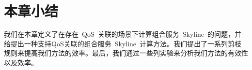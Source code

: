 \section{本章小结}

我们在本章定义了在存在~QoS~关联的场景下计算组合服务~Skyline~的问题，并给提出一种支持QoS关联的组合服务~Skyline~计算方法。我们提出了一系列剪枝规则来提高我们方法的效率。最后，我们通过一些列实验来分析我们方法的有效性以及效率。